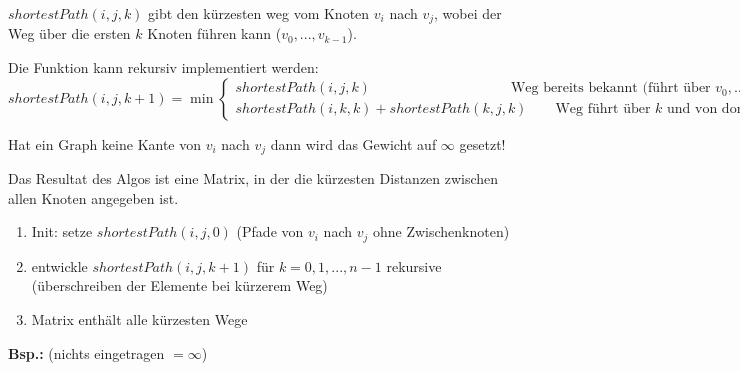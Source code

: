 $shortestPath(i,j,k)$ gibt den kürzesten weg vom Knoten $v_i$ nach $v_j$, wobei der Weg über die ersten $k$ Knoten führen kann ($v_0,...,v_{k-1}$).

Die Funktion kann rekursiv implementiert werden:
\[ shortestPath(i,j,k+1) = \min \begin{cases} shortestPath(i,j,k) \qquad \qquad \qquad \qquad \qquad \text{Weg bereits bekannt (führt über $v_0, \ldots, v_{k-1}$)}\\ shortestPath(i,k,k)+shortestPath(k,j,k) \qquad  \text{Weg führt über $k$ und von dort nach $j$} \end{cases} \]

Hat ein Graph keine Kante von $v_i$ nach $v_j$ dann wird das Gewicht auf $\infty$ gesetzt!

Das Resultat des Algos ist eine Matrix, in der die kürzesten Distanzen zwischen allen Knoten angegeben ist.

\begin{enumerate}
	\item Init: setze $shortestPath(i,j,0)$ (Pfade von $v_i$ nach $v_j$ ohne Zwischenknoten)
	\item entwickle $shortestPath(i,j,k+1)$ für $k=0,1,...,n-1$ rekursive (überschreiben der Elemente bei kürzerem Weg)
	\item Matrix enthält alle kürzesten Wege
\end{enumerate}

\textbf{Bsp.:} (nichts eingetragen $=\infty$)

